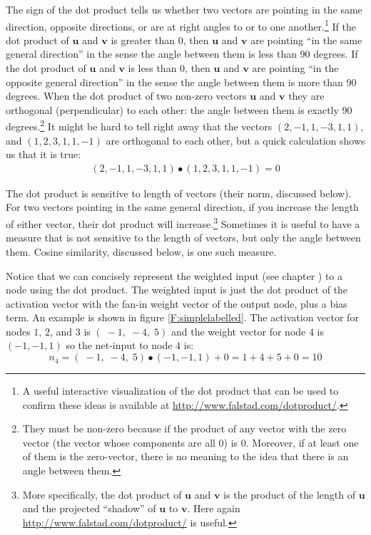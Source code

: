 
The sign of the dot product tells us whether two vectors are pointing in the same direction, opposite directions, or are at right angles to or  to one another.\footnote{A useful interactive visualization of the dot product that can be used to confirm these ideas is available at \url{http://www.falstad.com/dotproduct/}.} If the dot product of $\textbf{u}$ and $\textbf{v}$ is greater than 0, then $\textbf{u}$ and $\textbf{v}$ are pointing ``in the same general direction'' in the sense the angle between them is less than 90 degrees.  If the dot product of $\textbf{u}$ and $\textbf{v}$ is less than 0, then $\textbf{u}$ and $\textbf{v}$ are pointing ``in the opposite general direction'' in the sense the angle between them is more than 90 degrees. When the dot product of two non-zero vectors $\textbf{u}$ and $\textbf{v}$ they are orthogonal (perpendicular) to each other: the angle between them is exactly 90 degrees.\footnote{They must be non-zero because if the product of any vector with the zero vector (the vector whose components are all $0$) is $0$. Moreover, if at least one of them is the zero-vector, there is no meaning to the idea that there is an angle between them.} It might be hard to tell right away that the vectors $(2,-1,1,-3,1,1)$, and $(1,2,3,1,1,-1)$ are orthogonal to each other, but a quick calculation 
shows us that it is true:
\begin{eqnarray*}
           (2,-1,1,-3,1,1) \bullet (1,2,3,1,1,-1) = 0
\end{eqnarray*}

The dot product is sensitive to length of vectors (their norm, discussed below). For two vectors pointing in the same general direction, if you increase the length of either vector, their dot product will increase.\footnote{More specifically, the dot product of $\textbf{u}$ and $\textbf{v}$ is the product of the length of $\textbf{u}$ and the projected ``shadow'' of $\textbf{u}$ to $\textbf{v}$. Here again \url{http://www.falstad.com/dotproduct/} is useful.} Sometimes it is useful to have a measure that is not sensitive to the length of vectors, but only the angle between them. Cosine similarity, discussed below, is one such measure.

   Notice that we can concisely represent the weighted input (see chapter 
) to a node using the dot product. The weighted input 
is just the dot product of the activation vector with the fan-in weight vector 
of the output node, plus a bias term. An example is shown in figure 
\ref{F:simplelabelled}. The activation vector for nodes $1$, $2$, and $3$ is 
$(\; -1,\; -4,\; 5)$ and the weight vector for node $4$ is $(-1,-1,1)$ so the 
net-input to node $4$ is:
\begin{equation*}
n_4 = (\; -1,\; -4,\; 5) \bullet (-1,-1,1) + 0  = 1 + 4 + 5 + 0 = 10
\end{equation*}
 
